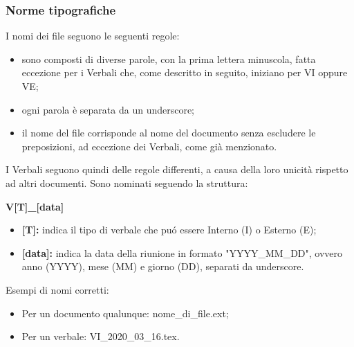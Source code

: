     \subsubsection{Norme tipografiche}
        I nomi dei file seguono le seguenti regole:
        \begin{itemize}
          \item sono composti di diverse parole, con la prima lettera minuscola, fatta eccezione per i Verbali che, come descritto in seguito, iniziano per VI oppure VE;
          \item ogni parola è separata da un underscore;
          \item il nome del file corrisponde al nome del documento senza escludere le preposizioni, ad eccezione dei Verbali, come già menzionato.
        \end{itemize}
        I Verbali seguono quindi delle regole differenti, a causa della loro unicità rispetto ad altri documenti. Sono nominati seguendo la struttura:
        \begin{center}
          \textbf{{V[T]\_[data]}}
        \end{center}
        \begin{itemize}
          \item \textbf{[T]:} indica il tipo di verbale che puó essere Interno (I) o Esterno (E);
          \item \textbf{[data]:} indica la data della riunione in formato "YYYY\_MM\_DD", ovvero anno (YYYY), mese (MM) e giorno (DD), separati da underscore.
        \end{itemize}
        Esempi di nomi corretti:
        \begin{itemize}
          \item Per un documento qualunque: nome\_di\_file.ext;
          \item Per un verbale: VI\_2020\_03\_16.tex.
        \end{itemize}

